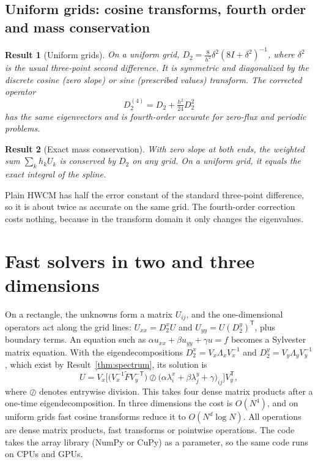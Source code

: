 \documentclass[preprint,12pt]{elsarticle}
\newtheorem{result}{Result}
\theoremstyle{remark}
\begin{document}
\subsection{Uniform grids: cosine transforms, fourth order and mass conservation}
\begin{result}[Uniform grids]\label{thm:fourth}
On a uniform grid, $D_2=\frac{8}{h^2}\delta^2(8I+\delta^2)^{-1}$, where $\delta^2$ is the usual three-point
second difference. It is symmetric and diagonalized by the discrete cosine (zero slope) or sine
(prescribed values) transform. The corrected operator
\begin{equation}\label{eq:D24}
D_2^{(4)}=D_2+\tfrac{h^2}{24}D_2^2
\end{equation}
has the same eigenvectors and is fourth-order accurate for zero-flux and periodic problems.
\end{result}

\begin{result}[Exact mass conservation]\label{prop:mass}
With zero slope at both ends, the weighted sum $\sum_kh_kU_k$ is conserved by $D_2$ on any grid. On a
uniform grid, it equals the exact integral of the spline.
\end{result}

Plain HWCM has half the error constant of the standard three-point difference, so it is about twice as
accurate on the same grid. The fourth-order correction costs nothing, because in the transform domain it
only changes the eigenvalues.

\section{Fast solvers in two and three dimensions}\label{sec:tensor}
On a rectangle, the unknowns form a matrix $U_{ij}$, and the one-dimensional operators act along the grid
lines: $U_{xx}=D_2^xU$ and $U_{yy}=U(D_2^y)^{\mathsf T}$, plus boundary terms. An equation such as
$\alpha u_{xx}+\beta u_{yy}+\gamma u=f$ becomes a Sylvester matrix equation. With the eigendecompositions
$D_2^x=V_x\Lambda_xV_x^{-1}$ and $D_2^y=V_y\Lambda_yV_y^{-1}$, which exist by Result~\ref{thm:spectrum},
its solution is
\begin{equation}\label{eq:fdm}
U=V_x\Big[\big(V_x^{-1}\tilde FV_y^{-\mathsf T}\big)\oslash\big(\alpha\lambda^x_i+\beta\lambda^y_j+\gamma\big)_{ij}\Big]V_y^{\mathsf T},
\end{equation}
where $\oslash$ denotes entrywise division. This takes four dense matrix products after a one-time
eigendecomposition. In three dimensions the cost is $O(N^4)$, and on uniform grids fast cosine
transforms reduce it to $O(N^d\log N)$. All operations are dense matrix products, fast transforms or
pointwise operations. The code takes the array library (NumPy or CuPy) as a parameter, so the same code
runs on CPUs and GPUs.
\end{document}
